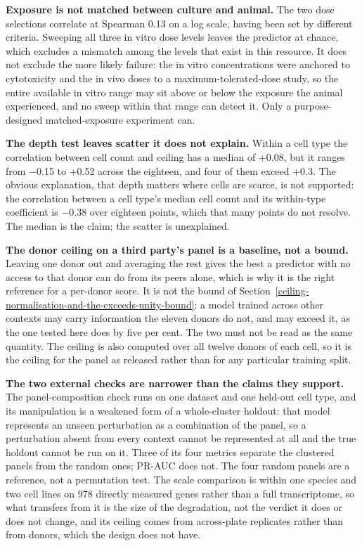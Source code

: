 \documentclass[11pt,a4paper]{article}
\begin{document}
\textbf{Exposure is not matched between culture and animal.} The two
dose selections correlate at Spearman 0.13 on a log scale, having been
set by different criteria. Sweeping all three in vitro dose levels
leaves the predictor at chance, which excludes a mismatch among the
levels that exist in this resource. It does not exclude the more likely
failure: the in vitro concentrations were anchored to cytotoxicity and
the in vivo doses to a maximum-tolerated-dose study, so the entire
available in vitro range may sit above or below the exposure the animal
experienced, and no sweep within that range can detect it. Only a
purpose-designed matched-exposure experiment can.

\textbf{The depth test leaves scatter it does not explain.} Within a
cell type the correlation between cell count and ceiling has a median of
+0.08, but it ranges from −0.15 to +0.52 across the eighteen, and four
of them exceed +0.3. The obvious explanation, that depth matters where
cells are scarce, is not supported: the correlation between a cell
type's median cell count and its within-type coefficient is −0.38 over
eighteen points, which that many points do not resolve. The median is
the claim; the scatter is unexplained.

\textbf{The donor ceiling on a third party's panel is a baseline, not a
bound.} Leaving one donor out and averaging the rest gives the best a
predictor with no access to that donor can do from its peers alone,
which is why it is the right reference for a per-donor score. It is not
the bound of Section~\ref{ceiling-normalisation-and-the-exceeds-unity-bound}: a model trained across other contexts may
carry information the eleven donors do not, and may exceed it, as the
one tested here does by five per cent. The two must not be read as the
same quantity. The ceiling is also computed over all twelve donors of
each cell, so it is the ceiling for the panel as released rather than
for any particular training split.

\textbf{The two external checks are narrower than the claims they
support.} The panel-composition check runs on one dataset and one
held-out cell type, and its manipulation is a weakened form of a
whole-cluster holdout: that model represents an unseen perturbation as a
combination of the panel, so a perturbation absent from every context
cannot be represented at all and the true holdout cannot be run on it.
Three of its four metrics separate the clustered panels from the random
ones; PR-AUC does not. The four random panels are a reference, not a
permutation test. The scale comparison is within one species and two
cell lines on 978 directly measured genes rather than a full
transcriptome, so what transfers from it is the size of the degradation,
not the verdict it does or does not change, and its ceiling comes from
across-plate replicates rather than from donors, which the design does
not have.
\end{document}
